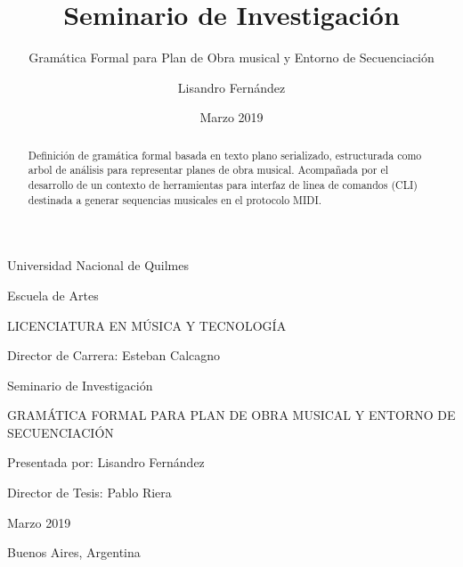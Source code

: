 \documentclass[]{article}
\title{Seminario de Investigación}
\subtitle{Gramática Formal para Plan de Obra musical y Entorno de Secuenciación}
\author{Lisandro Fernández}
\date{Marzo 2019}
\begin{document}
\begin{titlepage}

\vspace*{\fill}

\begin{center}
\huge
Universidad Nacional de Quilmes
\end{center}

\bigskip
\bigskip

\begin{center}
Escuela de Artes
\end{center}

\begin{center}
\uppercase{Licenciatura en Música y Tecnología}
\end{center}

\begin{center}
Director de Carrera:
Esteban Calcagno
\end{center}

\bigskip
\bigskip
\bigskip

\begin{center}
\huge
Seminario de Investigación
\end{center}

\bigskip
\begin{center}
\uppercase{Gramática Formal para Plan de Obra musical y Entorno de Secuenciación}
\end{center}
\bigskip

\begin{center}
Presentada por:
Lisandro Fernández
\end{center}

\begin{center}
Director de Tesis:
Pablo Riera
\end{center}

\bigskip
\bigskip
\begin{abstract}
Definición de gramática formal basada en texto plano serializado,
estructurada como arbol de análisis para representar planes de obra
musical. Acompañada por el desarrollo de un contexto de herramientas
para interfaz de linea de comandos (CLI) destinada a generar sequencias
musicales en el protocolo MIDI.
\end{abstract}

\bigskip
\bigskip
\bigskip

\begin{center}
Marzo 2019
\end{center}

\begin{center}
Buenos Aires, Argentina
\end{center}

\vspace*{\fill}

\end{titlepage}
\end{document}

